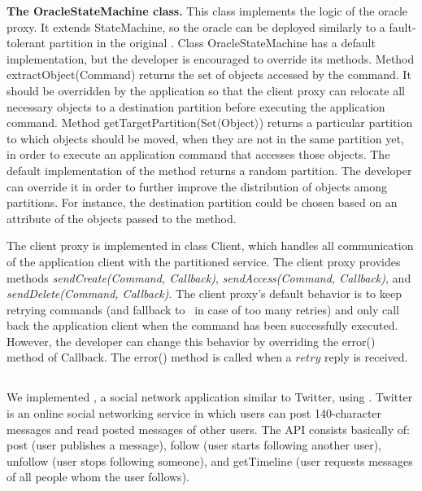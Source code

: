 \textbf{The OracleStateMachine class.} This class implements the logic of the
oracle proxy. It extends StateMachine, so the oracle can be deployed similarly
to a fault-tolerant partition in the original \ssmr{}. Class OracleStateMachine
has a default implementation, but the developer is encouraged to override its
methods. Method extractObject(Command) returns the set of objects accessed by
the command. It should be overridden by the application so that the client proxy
can relocate all necessary objects to a destination partition before executing
the application command.
Method getTargetPartition(Set$\langle$Object$\rangle$) returns a particular
partition to which objects should be moved, when they are not in the same
partition yet, in order to execute an application command that accesses those
objects. The default implementation of the method returns a random partition.
The developer can override it in order to further improve the distribution of
objects among partitions. For instance, the destination partition could be
chosen based on an attribute of the objects passed to the method.

The client proxy is implemented in class Client, which handles all communication
of the application client with the partitioned service. The client proxy
provides methods \emph{sendCreate(Command, Callback)}, \emph{sendAccess(Command,
Callback)}, and \emph{sendDelete(Command, Callback)}. The client proxy's default
behavior is to keep retrying commands (and fallback to \ssmr\ in case of too
many retries) and only call back the application client when the command has
been successfully executed. However, the developer can change this behavior by
overriding the error() method of Callback. The error() method is called when a
$retry$ reply is received.


\subsection{\dssmrappname}

We implemented \dssmrappname{}, a social network application similar to Twitter,
using \dssmrlibname{}. Twitter is an online social networking service in which users
can post 140-character messages and read posted messages of other users. The API
consists basically of: post (user publishes a message), follow (user starts
following another user), unfollow (user stops following someone), and
getTimeline (user requests messages of all people whom the user follows).

